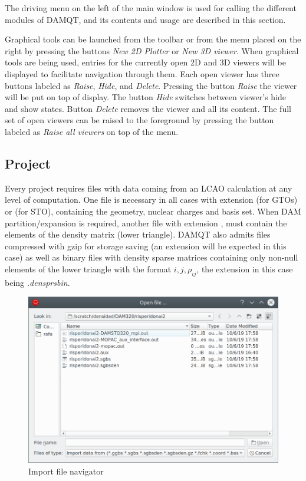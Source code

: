 \documentclass[10pt]{article}
\begin{document}
\vspace*{3mm}

The driving menu on the left of the main window is used for calling the different
modules of DAMQT, and its contents and usage are described in this section.

Graphical tools can be launched from the toolbar or from the menu placed on the right by pressing the 
buttons {\it New 2D Plotter} or {\it New 3D viewer}. When
graphical tools are being used, entries for the currently open 2D and 3D viewers
will be displayed to facilitate navigation through them. Each open viewer has three buttons
labeled as {\it Raise}, {\it Hide}, and {\it Delete}. Pressing the button {\it Raise} the viewer will
be put on top of display. The button {\it Hide} switches between viewer's hide and show states. 
Button {\it Delete} removes the viewer and all its content. The full set of open viewers can be raised
to the foreground by pressing the button labeled as {\it Raise all viewers} on top of the menu.

\subsection{Project \label{sec:2.1}}


Every project requires files with data
coming from an LCAO calculation at any level of computation. 
One file is necessary in all cases with
extension \ggbs{} (for GTOs) or
\sgbs{} (for STO), containing the geometry, nuclear
charges and basis set.
When DAM partition/expansion is required, another file with extension
\den{}, must contain the elements of the density
matrix (lower triangle). DAMQT also admits \den{} files compressed with 
gzip for storage saving (an extension \dengz{} will be expected
in this case) as well as binary files with density sparse matrices containing only non-null elements of the lower triangle with the format $i,j,\rho_{ij}$, the extension in this case being {\it .densprsbin}.

\begin{figure}[H]
\begin{center}
\includegraphics[width=.5\linewidth]{damqt_fig_2_1_1.png}
\end{center}
\caption{Import file navigator \label{fig:2_1_1}}
\end{figure}
\end{document}
